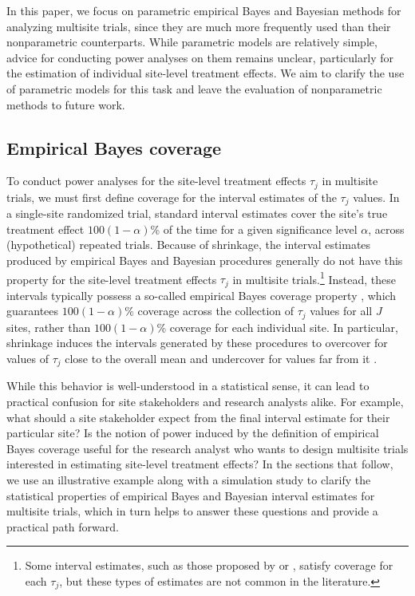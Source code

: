 \documentclass[]{article}
\begin{document}
In this paper, we focus on parametric empirical Bayes and Bayesian methods for analyzing multisite trials, since they are much more frequently used than their nonparametric counterparts.
While parametric models are relatively simple, advice for conducting power analyses on them remains unclear, particularly for the estimation of individual site-level treatment effects.
We aim to clarify the use of parametric models for this task and leave the evaluation of nonparametric methods to future work.

\subsection{Empirical Bayes coverage}

To conduct power analyses for the site-level treatment effects $\tau_j$ in multisite trials, we must first define coverage for the interval estimates of the $\tau_j$ values.
In a single-site randomized trial, standard interval estimates cover the site's true treatment effect $100(1-\alpha)$\% of the time for a given significance level $\alpha$, across (hypothetical) repeated trials.
Because of shrinkage, the interval estimates produced by empirical Bayes and Bayesian procedures generally do not have this property for the site-level treatment effects $\tau_j$ in multisite trials.\footnote{Some interval estimates, such as those proposed by \citet{tseng1997good} or \citet{yu2018adaptive}, satisfy coverage for each $\tau_j$, but these types of estimates are not common in the literature.}
Instead, these intervals typically possess a so-called empirical Bayes coverage property \citep{morris1983parametric}, which guarantees $100(1-\alpha)$\% coverage across the collection of $\tau_j$ values for all $J$ sites, rather than $100(1-\alpha)$\% coverage for each individual site.
In particular, shrinkage induces the intervals generated by these procedures to overcover for values of $\tau_j$ close to the overall mean and undercover for values far from it \citep{snijders2011multilevel}.

While this behavior is well-understood in a statistical sense, it can lead to practical confusion for site stakeholders and research analysts alike.
For example, what should a site stakeholder expect from the final interval estimate for their particular site?
Is the notion of power induced by the definition of empirical Bayes coverage useful for the research analyst who wants to design multisite trials interested in estimating site-level treatment effects?
In the sections that follow, we use an illustrative example along with a simulation study to clarify the statistical properties of empirical Bayes and Bayesian interval estimates for multisite trials, which in turn helps to answer these questions and provide a practical path forward.
\end{document}

